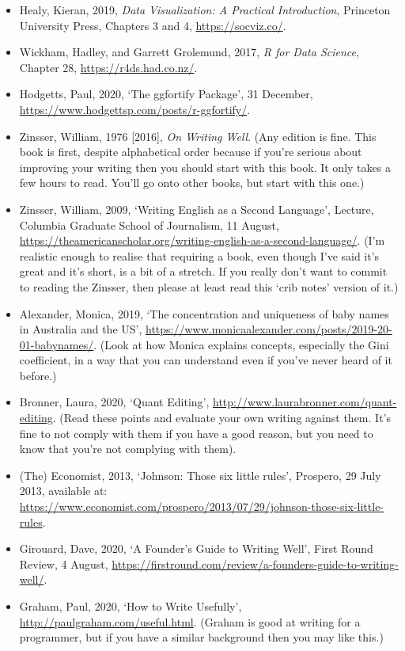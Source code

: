 \documentclass[
]{book}
\providecommand{\tightlist}{%
  \setlength{\itemsep}{0pt}\setlength{\parskip}{0pt}}
\begin{document}
\begin{itemize}
\tightlist
\item
  Healy, Kieran, 2019, \emph{Data Visualization: A Practical Introduction}, Princeton University Press, Chapters 3 and 4, \url{https://socviz.co/}.
\item
  Wickham, Hadley, and Garrett Grolemund, 2017, \emph{R for Data Science}, Chapter 28, \url{https://r4ds.had.co.nz/}.
\item
  Hodgetts, Paul, 2020, `The ggfortify Package', 31 December, \url{https://www.hodgettsp.com/posts/r-ggfortify/}.
\item
  Zinsser, William, 1976 {[}2016{]}, \emph{On Writing Well}. (Any edition is fine. This book is first, despite alphabetical order because if you're serious about improving your writing then you should start with this book. It only takes a few hours to read. You'll go onto other books, but start with this one.)
\item
  Zinsser, William, 2009, `Writing English as a Second Language', Lecture, Columbia Graduate School of Journalism, 11 August, \url{https://theamericanscholar.org/writing-english-as-a-second-language/}. (I'm realistic enough to realise that requiring a book, even though I've said it's great and it's short, is a bit of a stretch. If you really don't want to commit to reading the Zinsser, then please at least read this `crib notes' version of it.)
\item
  Alexander, Monica, 2019, `The concentration and uniqueness of baby names in Australia and the US', \url{https://www.monicaalexander.com/posts/2019-20-01-babynames/}. (Look at how Monica explains concepts, especially the Gini coefficient, in a way that you can understand even if you've never heard of it before.)
\item
  Bronner, Laura, 2020, `Quant Editing', \url{http://www.laurabronner.com/quant-editing}. (Read these points and evaluate your own writing against them. It's fine to not comply with them if you have a good reason, but you need to know that you're not complying with them).
\item
  (The) Economist, 2013, `Johnson: Those six little rules', Prospero, 29 July 2013, available at: \url{https://www.economist.com/prospero/2013/07/29/johnson-those-six-little-rules}.
\item
  Girouard, Dave, 2020, `A Founder's Guide to Writing Well', First Round Review, 4 August, \url{https://firstround.com/review/a-founders-guide-to-writing-well/}.
\item
  Graham, Paul, 2020, `How to Write Usefully', \url{http://paulgraham.com/useful.html}. (Graham is good at writing for a programmer, but if you have a similar background then you may like this.)
\end{itemize}
\end{document}
